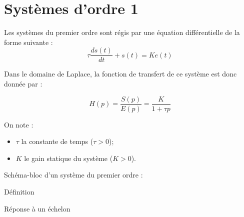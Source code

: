 \documentclass[10pt,fleqn]{article} %
\begin{document}

\vspace{2cm}
\pagestyle{fancy}
\thispagestyle{plain}

\section{Systèmes d'ordre 1}




\begin{defi}

Les systèmes du premier ordre sont régis par une équation différentielle de la
forme suivante :
$$
\tau \dfrac{ds(t)}{dt}+s(t) = Ke(t)
$$

\begin{minipage}[c]{.6\linewidth}
Dans le domaine de Laplace, la fonction de transfert de ce système est donc
donnée par :

$$
H(p)=\dfrac{S(p)}{E(p)} = \dfrac{K}{1+\tau p}
$$

On note :
\begin{itemize}
 \item $\tau$ la constante de temps ($\tau>0$);
\item $K$ le gain statique du système ($K>0$).
\end{itemize}
\end{minipage}\hfill
\begin{minipage}[c]{.35\linewidth}
Schéma-bloc d'un système du premier ordre :

\begin{center}
\end{center}
\end{minipage}
\end{defi}


Définition

Réponse à un échelon 
\end{document}
